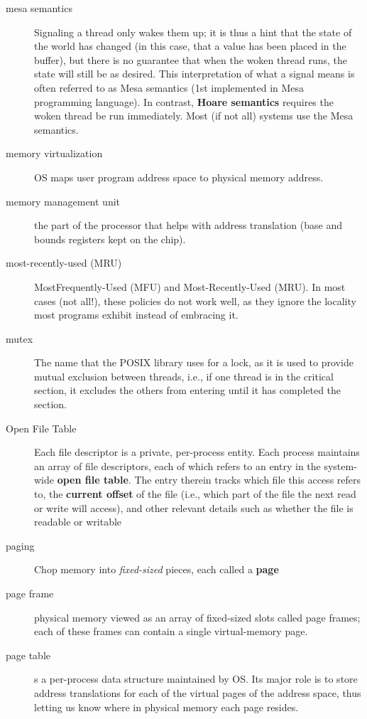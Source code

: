 \begin{description}
\item[mesa semantics] Signaling a thread only wakes them up; it is thus a hint that the state of the world has changed (in this case, that a value has been placed in the buffer), but there is no guarantee that when the woken thread runs, the state will still be as desired. This interpretation of what a signal means is often referred to as Mesa semantics (1st implemented in Mesa programming language). In contrast, \textbf{Hoare semantics} requires the woken thread be run immediately.  Most (if not all) systems use the Mesa semantics.

\item[memory virtualization] OS maps user program address space to physical memory address.

\item[memory management unit] the part of the processor that helps with address translation (base and bounds registers kept on the chip).

\item[most-recently-used (MRU)] MostFrequently-Used (MFU) and Most-Recently-Used (MRU). In most cases (not all!), these policies do not work well, as they ignore the locality most programs exhibit instead of embracing it.

\item[mutex] The name that the POSIX library uses for a lock, as it is used to provide mutual exclusion between threads, i.e., if one thread is in the critical section, it excludes the others from entering until it has completed the section.

\item[Open File Table] Each file descriptor is a private, per-process entity. Each process maintains an array of file descriptors, each of which refers to an entry in the system-wide \textbf{open file table}. The entry therein tracks which file this access refers to, the \textbf{current offset} of the file (i.e., which part of the file the next read or write will access), and other relevant details such as whether the file is readable or writable

\item[paging] Chop memory into \emph{fixed-sized} pieces, each called a \textbf{page}

\item[page frame] physical memory viewed as an array of fixed-sized slots called page frames; each of these frames can contain a single virtual-memory page.

\item[page table] s a per-process data structure maintained by OS.  Its major role is to store address translations for each of the virtual pages of the address space, thus letting us know where in physical memory each page resides.


\end{description}
